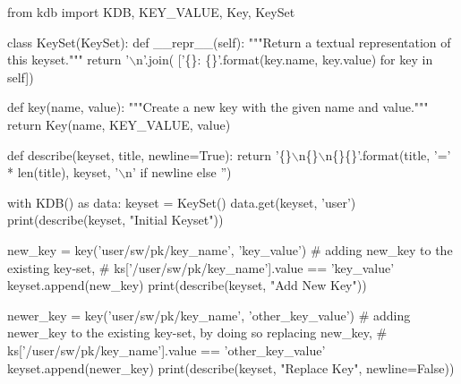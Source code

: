 \begin{DoxyCode}
\textcolor{keyword}{from} kdb \textcolor{keyword}{import} KDB, KEY\_VALUE, Key, KeySet


\textcolor{keyword}{class }KeySet(KeySet):
    \textcolor{keyword}{def }\_\_repr\_\_(self):
        \textcolor{stringliteral}{"""Return a textual representation of this keyset."""}
        \textcolor{keywordflow}{return} \textcolor{stringliteral}{'\(\backslash\)n'}.join(
            [\textcolor{stringliteral}{'\{\}: \{\}'}.format(key.name, key.value) \textcolor{keywordflow}{for} key \textcolor{keywordflow}{in} self])


\textcolor{keyword}{def }key(name, value):
    \textcolor{stringliteral}{"""Create a new key with the given name and value."""}
    \textcolor{keywordflow}{return} Key(name, KEY\_VALUE, value)


\textcolor{keyword}{def }describe(keyset, title, newline=True):
    \textcolor{keywordflow}{return} \textcolor{stringliteral}{'\{\}\(\backslash\)n\{\}\(\backslash\)n\{\}\{\}'}.format(title, \textcolor{stringliteral}{'='} * len(title), keyset,
                                 \textcolor{stringliteral}{'\(\backslash\)n'} \textcolor{keywordflow}{if} newline \textcolor{keywordflow}{else} \textcolor{stringliteral}{''})


with KDB() \textcolor{keyword}{as} data:
    keyset = KeySet()
    data.get(keyset, \textcolor{stringliteral}{'user'})
    print(describe(keyset, \textcolor{stringliteral}{"Initial Keyset"}))

    new\_key = key(\textcolor{stringliteral}{'user/sw/pk/key\_name'}, \textcolor{stringliteral}{'key\_value'})
    \textcolor{comment}{# adding new\_key to the existing key-set,}
    \textcolor{comment}{# ks['/user/sw/pk/key\_name'].value == 'key\_value'}
    keyset.append(new\_key)
    print(describe(keyset, \textcolor{stringliteral}{"Add New Key"}))

    newer\_key = key(\textcolor{stringliteral}{'user/sw/pk/key\_name'}, \textcolor{stringliteral}{'other\_key\_value'})
    \textcolor{comment}{# adding newer\_key to the existing key-set, by doing so replacing new\_key,}
    \textcolor{comment}{# ks['/user/sw/pk/key\_name'].value == 'other\_key\_value'}
    keyset.append(newer\_key)
    print(describe(keyset, \textcolor{stringliteral}{"Replace Key"}, newline=\textcolor{keyword}{False}))
\end{DoxyCode}
 